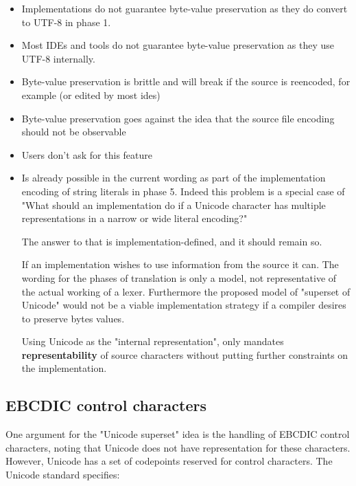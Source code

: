 \documentclass{wg21}
\begin{document}
\begin{itemize}
\item Implementations do not guarantee byte-value preservation as they do convert to UTF-8 in phase 1.
\item Most IDEs and tools do not guarantee byte-value preservation as they use UTF-8 internally.
\item Byte-value preservation is brittle and will break if the source is reencoded, for example (or edited by most ides)
\item Byte-value preservation goes against the idea that the source file encoding should not be observable
\item Users don't ask for this feature
\item Is already possible in the current wording as part of the implementation encoding of string literals in phase 5. Indeed this problem is a special case of
"What should an implementation do if a Unicode character has multiple representations in a narrow or wide literal encoding?"

The answer to that is implementation-defined, and it should remain so.

If an implementation wishes to use information from the source it can. The wording for the phases of translation is only a model, not representative of the actual working of a lexer. Furthermore the proposed model of "superset of Unicode" would not be a viable implementation strategy if a compiler desires to preserve bytes values.

Using Unicode as the "internal representation", only mandates \textbf{representability} 
of source characters without putting further constraints on the implementation.
\end{itemize}

\subsection{EBCDIC control characters}

One argument for the "Unicode superset" idea is the handling of EBCDIC control characters, noting that Unicode does not have representation for these characters.
However, Unicode has a set of codepoints reserved for control characters.
The Unicode standard specifies:
\end{document}

